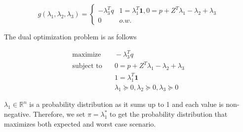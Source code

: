 \begin{equation}
  g( \lambda_1, \lambda_2, \lambda_3) = 
  \begin{cases}
    - \lambda_3^T q & 1 = \lambda_1^T \textbf{1},  0 = p+ Z^T \lambda_1 - \lambda_2 + \lambda_3 \\
    0 & o.w.
  \end{cases}
\end{equation}

The dual optimization problem is as follows

\begin{align}
  \text{maximize} & \quad -\lambda_3^T q \\
  \text{subject to} & \quad 0 = p+ Z^T \lambda_1 - \lambda_2 + \lambda_3 \\
  & \quad 1 = \lambda_1^T \textbf{1} \\
  & \quad \lambda_1 \succeq 0, \lambda_2\succeq 0, \lambda_3 \succeq 0
\end{align}

$\lambda_1 \in \mathbb{R}^n$ is a probability distribution as it sums up to 1 and each value is non-negative. Therefore, we set $\pi = \lambda_1^*$ to get the probability distribution that maximizes both expected and worst case scenario.

